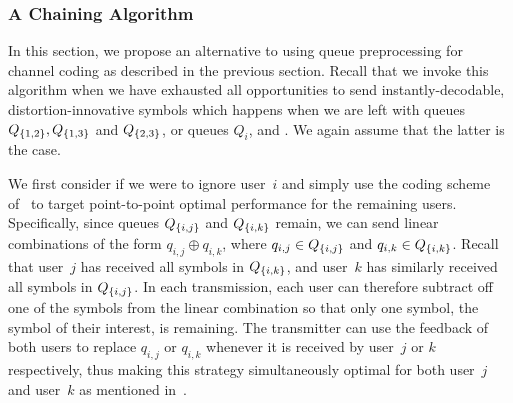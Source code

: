 \subsubsection{A Chaining Algorithm}
\label{subsubsec:chaining_algorithm}

In this section, we propose an alternative to using queue preprocessing for channel coding as described in the previous section.  Recall that we invoke this algorithm when we have exhausted all opportunities to send instantly-decodable, distortion-innovative symbols which happens when we are left with queues $Q_{\{1,2\}}, Q_{\{1,3\}}$ and $Q_{\{2,3\}}$, or queues $Q_i$,  and .  We again assume that the latter is the case.

We first consider if we were to ignore user~$i$ and simply use the coding scheme of~\cite{TMKS_TIT20} to target point-to-point optimal performance for the remaining users.  Specifically, since queues $Q_{\{i,j\}}$ and $Q_{\{i,k\}}$ remain, we can send linear combinations of the form $q_{i,j} \oplus q_{i, k}$, where $q_{i, j} \in Q_{\{i, j\}}$ and $q_{i, k} \in Q_{\{i, k\}}$.  Recall that user~$j$ has received all symbols in $Q_{\{i,k\}}$, and user~$k$ has similarly received all symbols in $Q_{\{i,j\}}$.  In each transmission, each user can therefore subtract off one of the symbols from the linear combination so that only one symbol, the symbol of their interest, is remaining.  The transmitter can use the feedback of both users to replace $q_{i, j}$ or $q_{i, k}$ whenever it is received by user~$j$ or $k$ respectively, thus making this strategy simultaneously optimal for both user~$j$ and user~$k$ as mentioned in~\cite{TMKS_TIT20}.


